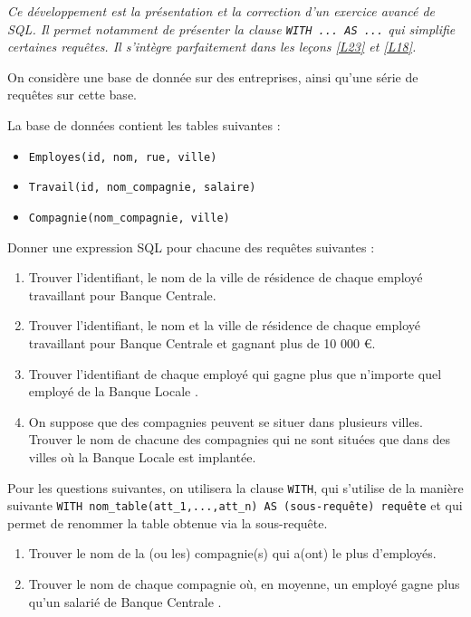 
\textit{ Ce développement est la présentation et la correction d'un exercice avancé de SQL. Il permet notamment de présenter la clause {\tt WITH ... AS ...} qui simplifie certaines requêtes. Il s'intègre parfaitement dans les leçons \ref{L23} et \ref{L18}.}



\begin{exercise}

On considère une base de donnée sur des entreprises, ainsi qu'une série de requêtes sur cette base. 

La base de données contient les tables suivantes :
\begin{itemize}
\item {\tt Employes(id, nom, rue, ville)}
\item {\tt Travail(id, nom\_compagnie, salaire)}
\item {\tt Compagnie(nom\_compagnie, ville)}
\end{itemize}
Donner une expression SQL pour chacune des requêtes suivantes :
\begin{enumerate}
\item Trouver l'identifiant, le nom de la ville de résidence de chaque employé travaillant pour \og Banque Centrale\fg{}.
\item Trouver l'identifiant, le nom et la ville de résidence de chaque employé travaillant pour \og Banque Centrale \fg{} et gagnant plus de 10 000 €.
\item Trouver l'identifiant de chaque employé qui gagne plus que n'importe quel employé de la \og Banque Locale \fg{}.
\item On suppose que des compagnies peuvent se situer dans plusieurs villes. Trouver le nom de chacune des compagnies qui ne sont situées que dans des villes où la \og Banque Locale \fg{} est implantée.
\end{enumerate}

Pour les questions suivantes, on utilisera la clause {\tt WITH}, qui s'utilise de la manière suivante {\tt WITH nom\_table(att\_1,...,att\_n) AS (sous-requête) requête} et qui permet de renommer la table obtenue via la sous-requête.

\begin{enumerate}[resume]
\item Trouver le nom de la (ou les) compagnie(s) qui a(ont) le plus d'employés.
\item Trouver le nom de chaque compagnie où, en moyenne, un employé gagne plus qu'un salarié de \og Banque Centrale \fg{}.
\end{enumerate}
\end{exercise}

